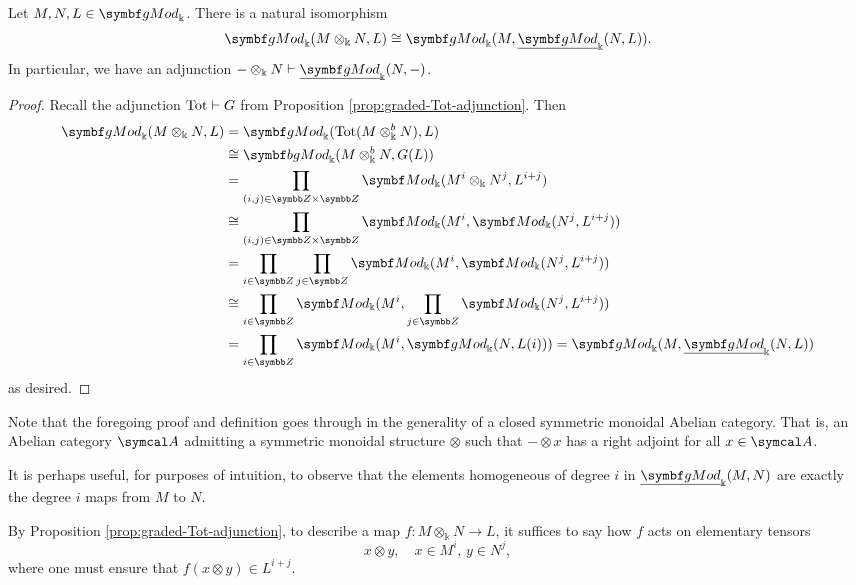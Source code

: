 \begin{proposition}
	Let \(M,N,L\in\gMod_\Bbbk\). There is a natural isomorphism
	\[ \gMod_\Bbbk(M\otimes_\Bbbk N, L) \cong \gMod_\Bbbk(M,\ugMod_\Bbbk(N,L)). \]
	In particular, we have an adjunction \(-\otimes_\Bbbk N \ladj \ugMod_\Bbbk(N,-)\).
\end{proposition}
\begin{proof}
Recall the adjunction \(\operatorname{Tot}\vdash G\) from Proposition \ref{prop:graded-Tot-adjunction}. Then
\begin{align*}
	\gMod_\Bbbk(M\otimes_\Bbbk N, L) &= \gMod_{\Bbbk}(\Tot(M\otimes_\Bbbk^b N),L) \\
	&\cong \bgMod_{\Bbbk}(M\otimes_\Bbbk^b N,G(L)) \\
	&= \prod_{(i,j)\in\Z\times\Z}\Mod_{\Bbbk}(M^i\otimes_\Bbbk N^j,L^{i+j}) \\
	&\cong \prod_{(i,j)\in\Z\times\Z}\Mod_{\Bbbk}(M^i,\Mod_\Bbbk(N^j,L^{i+j})) \\
	&= \prod_{i\in\Z}\prod_{j\in\Z}\Mod_{\Bbbk}(M^i,\Mod_\Bbbk(N^j,L^{i+j})) \\
	&\cong \prod_{i\in\Z}\Mod_{\Bbbk}(M^i, \prod_{j\in\Z}\Mod_\Bbbk(N^j,L^{i+j})) \\
	&= \prod_{i\in\Z}\Mod_{\Bbbk}(M^i, \gMod_\Bbbk(N,L(i))) = \gMod_\Bbbk(M,\ugMod_\Bbbk(N,L))
\end{align*}
as desired.
\end{proof}
\begin{remark}
	Note that the foregoing proof and definition goes through in the generality of a closed symmetric monoidal Abelian category. That is,
	an Abelian category \(\calA\) admitting a symmetric monoidal structure \(\otimes\) such that \(-\otimes x\) has a right adjoint for all \(x\in\calA\).
\end{remark}

\begin{remark}
	It is perhaps useful, for purposes of intuition, to observe that the elements homogeneous of degree \(i\) in \(\ugMod_\Bbbk(M,N)\) are exactly the degree \(i\) maps from \(M\) to \(N\).
\end{remark}

\begin{remark}
	By Proposition \ref{prop:graded-Tot-adjunction}, to describe a map \(f\!:M\otimes_\Bbbk N \to L\), it suffices to say how \(f\) acts on elementary tensors
	\[ x\otimes y,\quad x\in M^i,\, y\in N^j, \]
	where one must ensure that \(f(x\otimes y) \in L^{i+j}\).
\end{remark}

